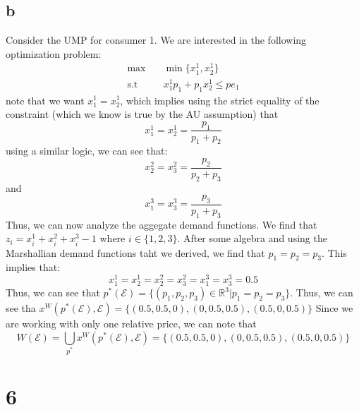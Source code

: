 \documentclass[11pt]{article}
\newcommand{\R}{\mathbb{R}}
\newcommand{\st}{\text{s.t}}
\begin{document}
\subsection*{b}
Consider the UMP for consumer 1. We are interested in the following optimization problem:
\begin{align*}
    \max & \quad \min\{x_1^1, x_2^1\}\\
    \st & \quad x_1^1 p_1 + p_1x_2^1 \leq p e_1
\end{align*}
note that we want $x_1^1 = x_2^1$, which implies using the strict equality of the constraint (which we know is true by the AU assumption) that 
\[
x_1^1 = x_2^1 = \frac{p_1}{p_1 + p_2}
\]
using a similar logic, we can see that:
\[
x_2^2 = x_3^2 = \frac{p_2}{p_2+p_3}
\]
and
\[
x_1^3 = x_3^3 = \frac{p_3}{p_1+p_3}
\]
Thus, we can now analyze the aggegate demand functions. 
We find that $z_i = x_i^1 + x_i^2 + x_i^3 - 1$ where $i \in \{1,2,3\}$. After some algebra and using the Marshallian demand functions taht we derived, we find that $p_1 = p_2 = p_3$. This implies that:
\[
    x_1^1 = x_2^1 = x_2^2 = x_3^2 = x_1^3 = x_3^3 = 0.5
\]
Thus, we can see that $p^*(\mathcal{E}) = \{(p_1, p_2, p_3) \in \R^3 | p_1 = p_2 = p_3\}$. Thus, we can see tha $x^W(p^*(\mathcal{E}), \mathcal{E}) = \{ (0.5,0.5,0), (0, 0.5, 0.5), (0.5, 0, 0.5)\}$ Since we are working with only one relative price, we can note that 
\[
    W(\mathcal{E}) = \bigcup_{p^*} x^W(p^*(\mathcal{E}), \mathcal{E}) = \{ (0.5,0.5,0), (0, 0.5, 0.5), (0.5, 0, 0.5)\}
\]
\newpage
\section*{6}
\end{document}
